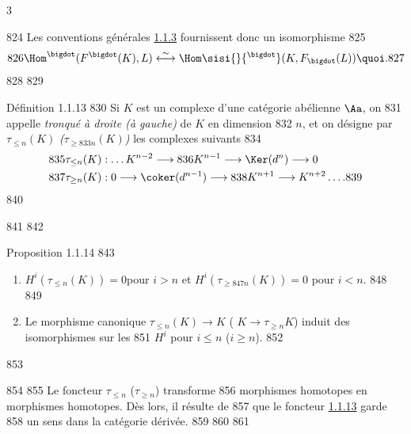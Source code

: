 3	\documentclass[10pt]{../fichiers-configuration-latex/smfart}
\begin{document}
   824	Les conventions générales \hyperref[XVII.def1.1.3]{1.1.3} fournissent donc un isomorphisme
   825	\begin{equation*}
   826	\Hom^{\bigdot}(F^{\bigdot}(K),L)\overset{\sim}{\longleftrightarrow}\Hom\sisi{}{^\bigdot}(K,F_{\bigdot}(L)){\quoi}.
   827	\end{equation*}
   828	
   829	\begin{enonce*}{Définition 1.1.13}
   830	Si $K$ est un complexe d'une catégorie abélienne $\Aa$, on
   831	appelle \emph{tronqué à droite (\resp à gauche)} de $K$ en dimension
   832	$n$, et on désigne par $\tau_{\leq n}(K)$ \emph{(\resp $\tau_{\geq
   833	    n}(K)$)} les complexes suivants
   834	\begin{align*}
   835	\tau_{\leq n}(K) &: \ldots K^{n-2}\longrightarrow
   836	K^{n-1}\longrightarrow \Ker(d^n)\longrightarrow 0\\
   837	\tau_{\geq n}(K) &: 0\longrightarrow \coker (d^{n-1})\longrightarrow
   838	K^{n+1}\longrightarrow K^{n+2}\ldots.
   839	\end{align*}
   840	\end{enonce*}
   841	
   842	\begin{enonce*}{Proposition 1.1.14}
   843	\begin{enumerate}
   844	\renewcommand{\theenumi}{\roman{enumi}}
   845	\renewcommand{\labelenumi}{(\theenumi)}
   846	\item $H^{i}(\tau_{\leq n}(K))=0$\pageoriginale pour $i>n$ et $H^{i}(\tau_{\geq
   847	n}(K))=0$ pour $i<n$.
   848	
   849	\item Le morphisme canonique $\tau_{\leq n}(K)\rightarrow K$ (	$K\rightarrow \tau_{\geq n}K$) induit des isomorphismes sur les
   851	$H^{i}$ pour $i\leq n$ (\resp $i\geq n$).
   852	\end{enumerate}
   853	\end{enonce*}
   854	
   855	Le foncteur $\tau_{\leq n}$ (\resp $\tau_{\geq n}$) transforme
   856	morphismes homotopes en morphismes homotopes. Dès lors, il résulte de
   857	 que le foncteur \hyperref[XVII.def1.1.13]{1.1.13} garde
   858	un sens dans la catégorie dérivée.
   859	
   860	\setcounter{subsubsection}{14}
   861	\subsubsection{}
\end{document}
